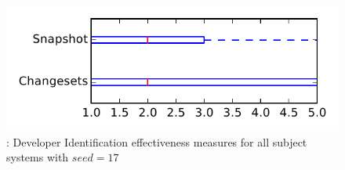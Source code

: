 
\begin{figure}
\centering
\includegraphics[height=0.4\textheight]{figures/dit_seed/rq1_tiny_17}
\caption{\rtwo: Developer Identification effectiveness measures for all subject systems with $seed=17$}
\label{fig:dit_seed:rq1:tiny}
\end{figure}
